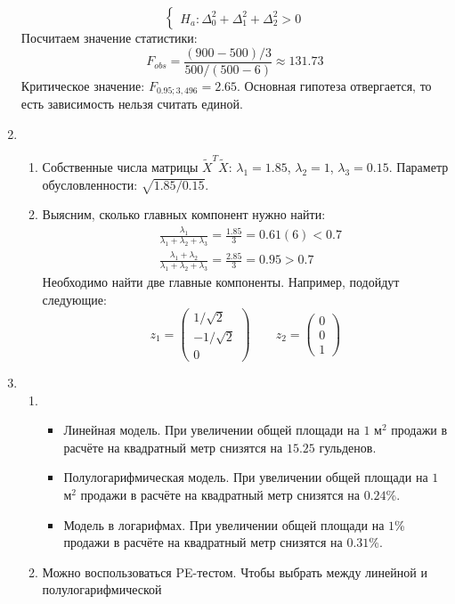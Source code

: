 \begin{enumerate}
\[\begin{cases}
H_a: \Delta_0^2 + \Delta_1^2 + \Delta_2^2 > 0
\end{cases}
\]
Посчитаем значение статистики:
\[
F_{obs} = \frac{(900 - 500) / 3}{500 / (500 - 6)} \approx 131.73
\]
Критическое значение: $F_{0.95; 3, 496} = 2.65$. Основная гипотеза отвергается,
то есть зависимость нельзя считать единой.
\item
\begin{enumerate}
  \item Собственные числа матрицы $\tilde X^T \tilde X$: $\lambda_1 = 1.85$,
  $\lambda_2 = 1$, $\lambda_3 = 0.15$. Параметр обусловленности: $\sqrt{1.85 / 0.15}$.
  \item Выясним, сколько главных компонент нужно найти:
  \begin{align*}
    &\frac{\lambda_1}{\lambda_1 + \lambda_2 + \lambda_3} = \frac{1.85}{3} = 0.61(6) < 0.7\\
    &\frac{\lambda_1 + \lambda_2}{\lambda_1 + \lambda_2 + \lambda_3} = \frac{2.85}{3} = 0.95 > 0.7
  \end{align*}
  Необходимо найти две главные компоненты. Например, подойдут следующие:
  \[
  z_1 = \begin{pmatrix}
  1/\sqrt{2} \\ -1 / \sqrt{2} \\ 0
  \end{pmatrix} \qquad
  z_2 = \begin{pmatrix}
  0 \\ 0 \\ 1
  \end{pmatrix}
  \]
\end{enumerate}
\item
\begin{enumerate}
  \item
  \begin{itemize}
    \item Линейная модель. При увеличении общей площади на $1$ м$^2$ продажи
    в расчёте на квадратный метр снизятся на $15.25$ гульденов.
    \item Полулогарифмическая модель. При увеличении общей площади на $1$ м$^2$ продажи
    в расчёте на квадратный метр снизятся на $0.24$\%.
    \item Модель в логарифмах. При увеличении общей площади на $1$\% продажи
    в расчёте на квадратный метр снизятся на $0.31$\%.
  \end{itemize}
  \item Можно воспользоваться PE-тестом. Чтобы выбрать между линейной и полулогарифмической

\end{enumerate}
\end{enumerate}
